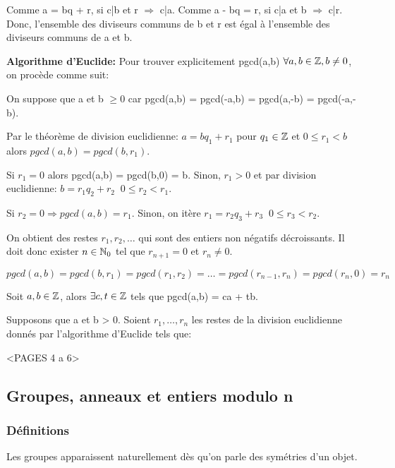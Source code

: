 \begin{demo}
Comme a = bq + r, si c|b et r $\Rightarrow$ c|a.
Comme a - bq = r, si c|a et b $\Rightarrow$ c|r.
Donc, l'ensemble des diviseurs communs de b et r est égal à l'ensemble des diviseurs communs de a et b.
\end{demo}

\hspace{-0.55cm}\textbf{Algorithme d'Euclide:} Pour trouver explicitement pgcd(a,b) $\forall a,b \in \mathbb{Z}, b\neq 0$, on procède comme suit:

On suppose que a et b $\geq 0$ car pgcd(a,b) = pgcd(-a,b) = pgcd(a,-b) = pgcd(-a,-b).

Par le théorème de division euclidienne: $a = bq_1 + r_1$ pour $q_1 \in \mathbb{Z}$ et $0 \leq r_1 < b$ alors $pgcd(a,b) = pgcd(b,r_1)$. 

Si $r_1 = 0$ alors pgcd(a,b) = pgcd(b,0) = b. Sinon, $r_1 > 0$ et par division euclidienne: $b = r_1 q_2 + r_2 \;\; 0 \leq r_2 < r_1$.

Si $r_2 = 0 \Rightarrow pgcd(a,b) = r_1$. Sinon, on itère $r_1 = r_2 q_3 + r_3 \;\; 0 \leq r_3 < r_2$.

On obtient des restes $r_1,r_2,\ldots$ qui sont des entiers non négatifs décroissants. Il doit donc exister $n \in \mathbb{N}_0$ tel que $r_{n+1} = 0$ et $r_n \neq 0$.

$pgcd(a,b) = pgcd(b,r_1) = pgcd(r_1,r_2) = \ldots = pgcd(r_{n-1},r_n) = pgcd(r_n,0) = r_n$

\begin{prop}
Soit $a,b \in \mathbb{Z}$, alors $\exists c,t \in \mathbb{Z}$ tels que pgcd(a,b) = ca + tb.
\end{prop}

\begin{demo}
Supposons que a et b > 0. Soient $r_1,\ldots ,r_n$ les restes de la division euclidienne donnés par l'algorithme d'Euclide tels que:

<PAGES 4 a 6>
\end{demo}

\subsection{Groupes, anneaux et entiers modulo n}

\subsubsection{Définitions}

Les groupes apparaissent naturellement dès qu'on parle des symétries d'un objet. 

